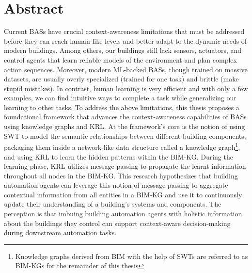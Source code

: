 \chapter*{Abstract}

Current \acp{BAS} have crucial context-awareness limitations that must be addressed before they can reach human-like levels and better adapt to the dynamic needs of modern buildings. Among others, our buildings still lack sensors, actuators, and control agents that learn reliable models of the environment and plan complex action sequences. Moreover, modern \ac{ML}-backed \acp{BAS}, though trained on massive datasets, are usually overly specialized (trained for one task) and brittle (make stupid mistakes). In contrast, human learning is very efficient and with only a few examples, we can find intuitive ways to complete a task while generalizing our learning to other tasks. To address the above limitations, this thesis proposes a foundational framework that advances the context-awareness capabilities of \acp{BAS} using knowledge graphs and \ac{KRL}. At the framework's core is the notion of using \ac{SWT} to model the semantic relationships between different building components, packaging them inside a network-like data structure called a knowledge graph\footnote{Knowledge graphs derived from \ac{BIM} with the help of \acp{SWT} are referred to as \acp{BIM-KG} for the remainder of this thesis}, and using \ac{KRL} to learn the hidden patterns within the \ac{BIM-KG}. During the learning phase, \ac{KRL} utilizes message-passing to propagate the learnt information throughout all nodes in the \ac{BIM-KG}. This research hypothesizes that building automation agents can leverage this notion of message-passing to aggregate contextual information from all entities in a \ac{BIM-KG} and use it to continuously update their understanding of a building's systems and components. The perception is that imbuing building automation agents with holistic information about the buildings they control can support context-aware decision-making during downstream automation tasks.

